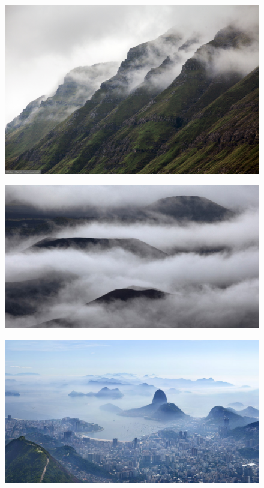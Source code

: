 \begin{figure}[H]
    \centering
    \includegraphics[width=\linewidth]{fogs/fog13.jpg} 
    \caption{}
    \label{fig:r13}
\end{figure}

\begin{figure}[H]
    \centering
    \includegraphics[width=\linewidth]{fogs/fog14.jpg} 
    \caption{}
    \label{fig:r14}
\end{figure}

\begin{figure}[H]
    \centering
    \includegraphics[width=\linewidth]{fogs/fog15.jpg} 
    \caption{}
    \label{fig:r15}
\end{figure}

